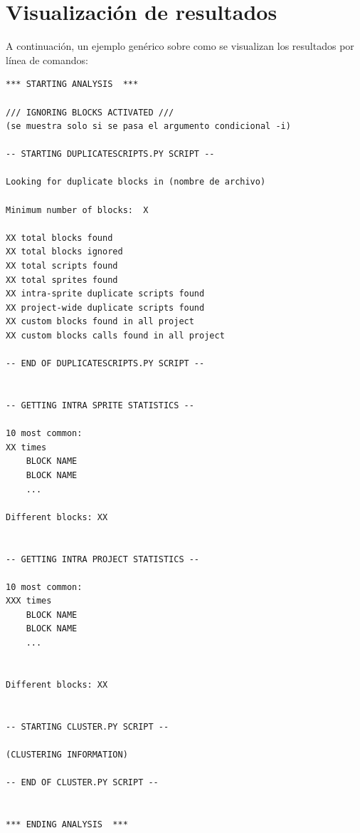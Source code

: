 \documentclass[a4paper, 12pt]{book}
\begin{document}
\section{Visualización de resultados} 
\label{sec:visualizacionresultados}

A continuación, un ejemplo genérico sobre como se visualizan los resultados por línea de comandos:

\begin{lstlisting}[style=consola,numbers=none]
*** STARTING ANALYSIS  ***

/// IGNORING BLOCKS ACTIVATED /// 
(se muestra solo si se pasa el argumento condicional -i)

-- STARTING DUPLICATESCRIPTS.PY SCRIPT --

Looking for duplicate blocks in (nombre de archivo)

Minimum number of blocks:  X

XX total blocks found
XX total blocks ignored
XX total scripts found
XX total sprites found
XX intra-sprite duplicate scripts found
XX project-wide duplicate scripts found
XX custom blocks found in all project
XX custom blocks calls found in all project

-- END OF DUPLICATESCRIPTS.PY SCRIPT --


-- GETTING INTRA SPRITE STATISTICS --

10 most common:
XX times
	BLOCK NAME 
	BLOCK NAME
	...

Different blocks: XX


-- GETTING INTRA PROJECT STATISTICS --

10 most common:
XXX times
	BLOCK NAME
	BLOCK NAME
	...


Different blocks: XX


-- STARTING CLUSTER.PY SCRIPT --

(CLUSTERING INFORMATION)

-- END OF CLUSTER.PY SCRIPT --


*** ENDING ANALYSIS  ***


\end{lstlisting}

\end{document}
